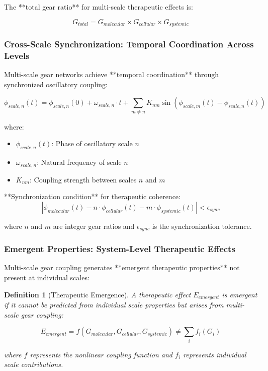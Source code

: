 \documentclass[12pt,a4paper]{article}
\newtheorem{definition}{Definition}[section]
\begin{document}
The **total gear ratio** for multi-scale therapeutic effects is:

\begin{equation}
G_{total} = G_{molecular} \times G_{cellular} \times G_{systemic}
\end{equation}

\subsubsection{Cross-Scale Synchronization: Temporal Coordination Across Levels}

Multi-scale gear networks achieve **temporal coordination** through synchronized oscillatory coupling:

\begin{equation}
\phi_{scale,n}(t) = \phi_{scale,n}(0) + \omega_{scale,n} \cdot t + \sum_{m \neq n} K_{nm} \sin(\phi_{scale,m}(t) - \phi_{scale,n}(t))
\end{equation}

where:
\begin{itemize}
\item $\phi_{scale,n}(t)$: Phase of oscillatory scale $n$
\item $\omega_{scale,n}$: Natural frequency of scale $n$
\item $K_{nm}$: Coupling strength between scales $n$ and $m$
\end{itemize}

**Synchronization condition** for therapeutic coherence:
\begin{equation}
|\phi_{molecular}(t) - n \cdot \phi_{cellular}(t) - m \cdot \phi_{systemic}(t)| < \epsilon_{sync}
\end{equation}

where $n$ and $m$ are integer gear ratios and $\epsilon_{sync}$ is the synchronization tolerance.

\subsubsection{Emergent Properties: System-Level Therapeutic Effects}

Multi-scale gear coupling generates **emergent therapeutic properties** not present at individual scales:

\begin{definition}[Therapeutic Emergence]
A therapeutic effect $E_{emergent}$ is emergent if it cannot be predicted from individual scale properties but arises from multi-scale gear coupling:

\begin{equation}
E_{emergent} = f(G_{molecular}, G_{cellular}, G_{systemic}) \neq \sum_{i} f_i(G_i)
\end{equation}

where $f$ represents the nonlinear coupling function and $f_i$ represents individual scale contributions.
\end{definition}
\end{document}
